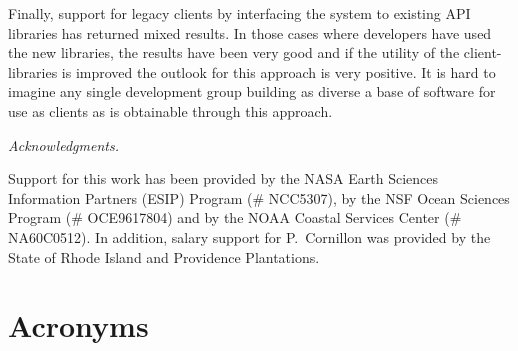 \documentclass[12pt]{article}
\begin{document}
Finally, support for legacy clients by interfacing the system to existing
\ac{API} libraries has returned mixed results. In those cases where
developers have used the new libraries, the results have been very good and
if the utility of the client-libraries is improved the outlook for this
approach is very positive. It is hard to imagine any single development group
building as diverse a base of software for use as clients as is obtainable
through this approach.

\bigskip
\noindent \emph{Acknowledgments.}

Support for this work has been provided by the \acs{NASA} Earth Sciences 
Information Partners (ESIP) Program (\# NCC5307), by the \acs{NSF} Ocean 
Sciences Program (\# OCE9617804) and by the \acs{NOAA} Coastal Services 
Center (\# NA60C0512). In addition, salary support for
P.~Cornillon was provided by the State of Rhode Island and Providence
Plantations.

\appendix

\section{Acronyms}
\begin{acronym}

\end{acronym}

\raggedright

\end{document}

